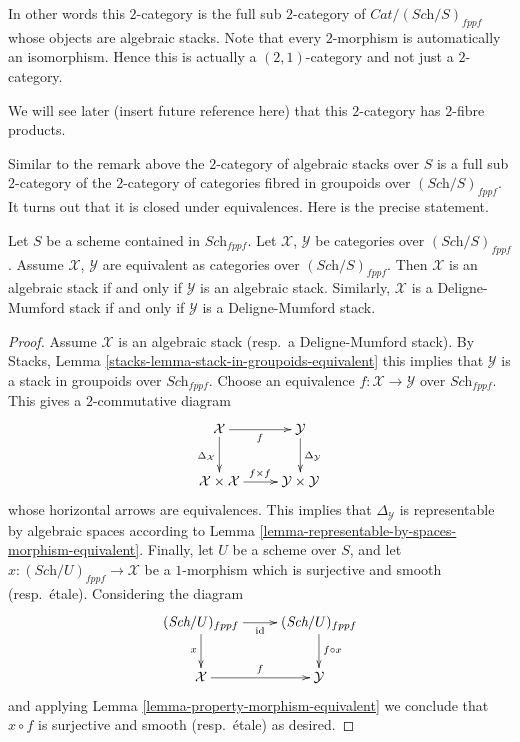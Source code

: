 \noindent
In other words this $2$-category is the full sub $2$-category of
$\textit{Cat}/(\textit{Sch}/S)_{fppf}$ whose objects are algebraic stacks.
Note that every $2$-morphism is automatically an isomorphism.
Hence this is actually a $(2, 1)$-category and not just a $2$-category.

\medskip\noindent
We will see later (insert future reference here) that this $2$-category
has $2$-fibre products.

\medskip\noindent
Similar to the remark above the $2$-category of algebraic stacks over $S$ is a
full sub $2$-category of the $2$-category of categories fibred in groupoids
over $(\textit{Sch}/S)_{fppf}$. It turns out that it is closed under
equivalences. Here is the precise statement.

\begin{lemma}
\label{lemma-equivalent}
Let $S$ be a scheme contained in $\textit{Sch}_{fppf}$.
Let $\mathcal{X}$, $\mathcal{Y}$ be categories over $(\textit{Sch}/S)_{fppf}$.
Assume $\mathcal{X}$, $\mathcal{Y}$ are equivalent as categories over
$(\textit{Sch}/S)_{fppf}$. Then $\mathcal{X}$ is an algebraic stack if and
only if $\mathcal{Y}$ is an algebraic stack. Similarly, $\mathcal{X}$
is a Deligne-Mumford stack if and only if $\mathcal{Y}$ is a Deligne-Mumford
stack.
\end{lemma}

\begin{proof}
Assume $\mathcal{X}$ is an algebraic stack (resp.\ a Deligne-Mumford stack). By
Stacks, Lemma \ref{stacks-lemma-stack-in-groupoids-equivalent}
this implies that $\mathcal{Y}$ is a stack in groupoids over
$\textit{Sch}_{fppf}$. Choose an equivalence $f : \mathcal{X} \to \mathcal{Y}$
over $\textit{Sch}_{fppf}$. This gives a $2$-commutative diagram
$$
\xymatrix{
\mathcal{X} \ar[r]_f \ar[d]_{\Delta_\mathcal{X}} &
\mathcal{Y} \ar[d]^{\Delta_\mathcal{Y}} \\
\mathcal{X} \times \mathcal{X} \ar[r]^{f \times f} &
\mathcal{Y} \times \mathcal{Y}
}
$$
whose horizontal arrows are equivalences. This implies that
$\Delta_\mathcal{Y}$ is representable by algebraic spaces according to
Lemma \ref{lemma-representable-by-spaces-morphism-equivalent}.
Finally, let $U$ be a scheme over $S$, and let
$x : (\textit{Sch}/U)_{fppf} \to \mathcal{X}$ be a $1$-morphism which
is surjective and smooth (resp.\ \'etale). Considering the diagram
$$
\xymatrix{
(\textit{Sch}/U)_{fppf} \ar[r]_{\text{id}} \ar[d]_{x} &
(\textit{Sch}/U)_{fppf} \ar[d]^{f \circ x} \\
\mathcal{X} \ar[r]^f &
\mathcal{Y}
}
$$
and applying
Lemma \ref{lemma-property-morphism-equivalent}
we conclude that $x \circ f$ is surjective and smooth (resp.\ \'etale)
as desired.
\end{proof}




